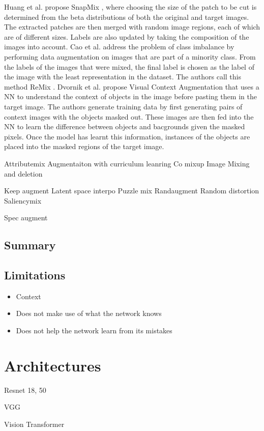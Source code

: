 Huang et al. propose SnapMix \cite{huangSnapMixSemanticallyProportional2021}, where choosing the size of the patch to be cut is determined from the beta distributions of both the original and target images. The extracted patches are then merged with random image regions, each of which are of different sizes. Labels are also updated by taking the composition of the images into account.
Cao et al. address the problem of class imbalance by performing data augmentation on images that are part of a minority class. From the labels of the images that were mixed, the final label is chosen as the label of the image with the least representation in the dataset. The authors call this method ReMix \cite{caoReMixImagetoImageTranslation2021}.
Dvornik et al. propose Visual Context Augmentation \cite{dvornikModelingVisualContext2018} that uses a NN to understand the context of objects in the image before pasting them in the target image. The authors generate training data by first generating pairs of context images with the objects masked out. These images are then fed into the NN to learn the difference between objects and bacgrounds given the masked pixels. Once the model has learnt this information, instances of the objects are placed into the masked regions of the target image.

Attributemix
Augmentaiton with curriculum leanring
Co mixup
Image Mixing and deletion

Keep augment
Latent space interpo
Puzzle mix
Randaugment
Random distortion
Saliencymix

Spec augment



\subsection{Summary}
\subsection{Limitations}
\begin{itemize}
\item Context
\item Does not make use of what the network knows
\item Does not help the network learn from its mistakes
\end{itemize}
\section{Architectures}
Resnet 18, 50

VGG

Vision Transformer
